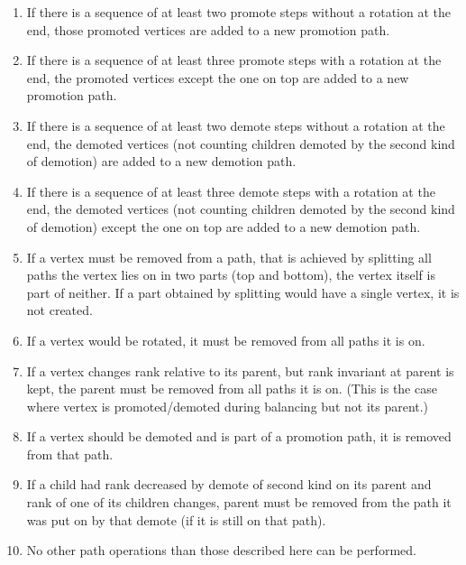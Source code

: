 \begin{enumerate}

\item If there is a sequence of at least two promote steps without a rotation at the end, those promoted vertices are added to a new promotion path. 

\item If there is a sequence of at least three promote steps with a rotation at the end, the promoted vertices except the one on top are added to a new promotion path.

\item If there is a sequence of at least two demote steps without a rotation at the end, the demoted vertices (not counting children demoted by the second kind of demotion) are added to a new demotion path.

\item If there is a sequence of at least three demote steps with a rotation at the end, the demoted vertices (not counting children demoted by the second kind of demotion) except the one on top are added to a new demotion path.

\item If a vertex must be removed from a path, that is achieved by splitting all paths the vertex lies on in two parts (top and bottom), the vertex itself is part of neither. If a part obtained by splitting would have a single vertex, it is not created.

\item If a vertex would be rotated, it must be removed from all paths it is on.

\item If a vertex changes rank relative to its parent, but rank invariant at parent is kept, the parent must be removed from all paths it is on. (This is the case where vertex is promoted/demoted during balancing but not its parent.)

\item If a vertex should be demoted and is part of a promotion path, it is removed from that path.

\item If a child had rank decreased by demote of second kind on its parent and rank of one of its children changes, parent must be removed from the path it was put on by that demote (if it is still on that path).

\item No other path operations than those described here can be performed.

\end{enumerate}

